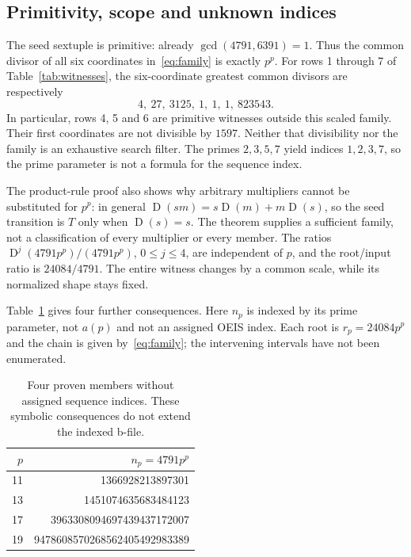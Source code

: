 \documentclass[11pt,a4paper]{article}
\theoremstyle{remark}
\newcommand{\D}{\operatorname{D}}
\begin{document}
\subsection{Primitivity, scope and unknown indices}
The seed sextuple is primitive: already $\gcd(4791,6391)=1$. Thus the common
divisor of all six coordinates in~\eqref{eq:family} is exactly $p^p$.
For rows 1 through 7 of Table~\ref{tab:witnesses}, the six-coordinate greatest
common divisors are respectively
\[
4,\ 27,\ 3125,\ 1,\ 1,\ 1,\ 823543.
\]
In particular, rows 4, 5 and 6 are primitive witnesses outside this scaled
family. Their first coordinates are not divisible by $1597$.
Neither that divisibility nor the family is an exhaustive search filter.
The primes $2,3,5,7$ yield indices $1,2,3,7$, so the prime parameter is
not a formula for the sequence index.

The product-rule proof also shows why arbitrary multipliers cannot be
substituted for $p^p$: in general
$\D(sm)=s\D(m)+m\D(s)$, so the seed transition is $T$ only when
$\D(s)=s$. The theorem supplies a sufficient family, not a classification
of every multiplier or every member.
The ratios $\D^j(4791p^p)/(4791p^p)$, $0\le j\le4$, are independent
of $p$, and the root/input ratio is $24084/4791$. The entire witness
changes by a common scale, while its normalized shape stays fixed.

Table~\ref{tab:unindexed} gives four further consequences.
Here $n_p$ is indexed by its prime parameter, not $a(p)$ and not an
assigned OEIS index. Each root is $r_p=24084p^p$ and the chain is
given by~\eqref{eq:family}; the intervening intervals have not been enumerated.
\begin{table}[htbp]
\centering
\begin{tabular}{rr}
\toprule
$p$ & $n_p=4791p^p$\\
\midrule
11 & 1366928213897301\\
13 & 1451074635683484123\\
17 & 3963308094697439437172007\\
19 & 9478608570268562405492983389\\
\bottomrule
\end{tabular}
\caption{Four proven members without assigned sequence indices.
These symbolic consequences do not extend the indexed b-file.}
\label{tab:unindexed}
\end{table}
\end{document}
